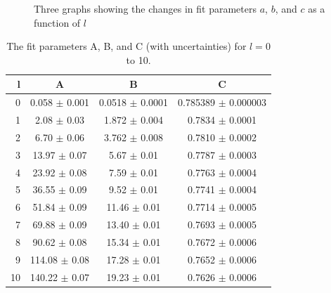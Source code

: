 \documentclass[12pt,twoside]{reedthesis}
\begin{document}
\begin{figure}[h]
\centering {}
\caption[Fit parameters for $l = 0$ to 10]{Three graphs showing the changes in fit parameters $a$, $b$, and $c$ as a function of $l$}
\label{fig:parameters}
\end{figure}

\begin{table}[h]
	\centering
	\caption{The fit parameters A, B, and C (with uncertainties) for $l = 0$ to 10.}
	\label{tab:fitparams}
	\begin{tabular}{r|ccc}
		l	& A	 	& B	 	& C	 \\
		\hline
		0	& 0.058	$\pm$ 0.001	& 0.0518	$\pm$ 0.0001	& 0.785389	$\pm$ 0.000003\\
		1	& 2.08	$\pm$ 0.03	& 1.872	$\pm$ 0.004	& 0.7834	$\pm$ 0.0001\\
		2	& 6.70	$\pm$ 0.06	& 3.762	$\pm$ 0.008	& 0.7810	$\pm$ 0.0002\\
		3	& 13.97	$\pm$ 0.07	& 5.67	$\pm$ 0.01	& 0.7787	$\pm$ 0.0003\\
		4	& 23.92	$\pm$ 0.08	& 7.59	$\pm$ 0.01	& 0.7763	$\pm$ 0.0004\\
		5	& 36.55	$\pm$ 0.09	& 9.52	$\pm$ 0.01	& 0.7741	$\pm$ 0.0004\\
		6	& 51.84	$\pm$ 0.09	& 11.46	$\pm$ 0.01	& 0.7714	$\pm$ 0.0005\\
		7	& 69.88	$\pm$ 0.09	& 13.40	$\pm$ 0.01	& 0.7693	$\pm$ 0.0005\\
		8	& 90.62	$\pm$ 0.08	& 15.34	$\pm$ 0.01	& 0.7672	$\pm$ 0.0006\\
		9	& 114.08	$\pm$ 0.08	& 17.28	$\pm$ 0.01	& 0.7652	$\pm$ 0.0006\\
		10	& 140.22	$\pm$ 0.07	& 19.23	$\pm$ 0.01	& 0.7626	$\pm$ 0.0006
	\end{tabular}
\end{table}
\end{document}
